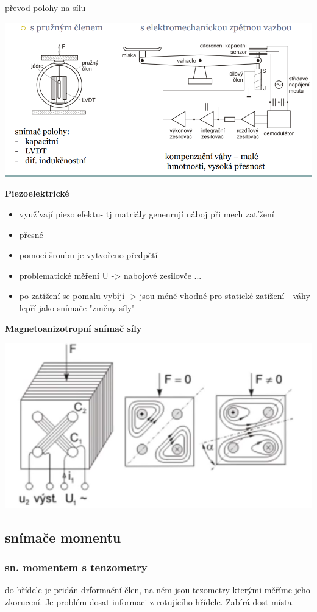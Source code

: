 převod polohy na sílu

\includegraphics*[scale= 0.6]{img/kompenacni_hmotnost.png}

{\bf Piezoelektrické}
\begin{itemize}
    \item využívají piezo efektu- tj matriály genenrují náboj při mech zatížení
    \item přesné
    \item pomocí šroubu je vytvořeno předpětí
    \item problematické měření U -> nabojové zesilovče ...
    \item po zatížení se pomalu vybíjí -> jsou méně vhodné pro statické zatížení - váhy lepří jako snímače "změny síly"
\end{itemize}

{\bf Magnetoanizotropní snímač síly}

\includegraphics*[scale= 0.5]{img/magnetosila.png}

\subsection*{snímače momentu}

\subsubsection*{sn. momentem s tenzometry}
do hřídele je pridán drformační člen, na něm jsou tezometry kterými měříme jeho zkorucení.
Je problém dosat informaci z rotujícího hřídele. Zabírá dost místa.

